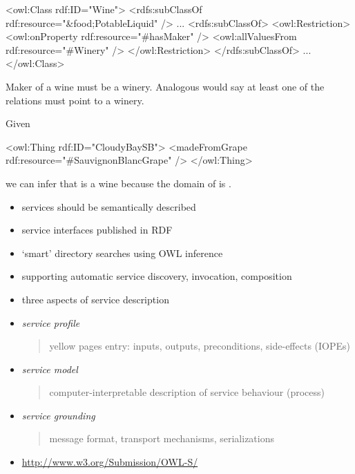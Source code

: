 \documentclass{sepslide-soa-faked} %
\begin{document}
\begin{slide}
\begin{xml}
<owl:Class rdf:ID="Wine">
  <rdfs:subClassOf rdf:resource="&food;PotableLiquid" />
  ...
  <rdfs:subClassOf>
    <owl:Restriction>
      <owl:onProperty rdf:resource="#hasMaker" />
      <owl:allValuesFrom rdf:resource="#Winery" />
    </owl:Restriction>
  </rdfs:subClassOf>
  ...
</owl:Class>
\end{xml}
Maker of a wine must be a winery.  Analogous
 would say at least one of the
 relations must point to a winery.
\end{slide}

\begin{slide}
Given
\begin{xml}
<owl:Thing rdf:ID="CloudyBaySB">
  <madeFromGrape rdf:resource="#SauvignonBlancGrape" />
</owl:Thing>
\end{xml}
we can infer that  is a wine because the
domain of  is .
\end{slide}

\begin{slide}
\begin{itemize}
\item services should be semantically described
\item service interfaces published in RDF
\item `smart' directory searches using OWL inference
\item supporting automatic service discovery, invocation, composition
\end{itemize}
\end{slide}

\begin{slide}
\begin{itemize}
\item three aspects of service description
\item \emph{service profile}
\begin{quote}
yellow pages entry: inputs, outputs, preconditions, side-effects (IOPEs)
\end{quote}
\item \emph{service model}
\begin{quote}
computer-interpretable description of service behaviour (process)
\end{quote}
\item \emph{service grounding}
\begin{quote}
message format, transport mechanisms, serializations
\end{quote}
\item \url{http://www.w3.org/Submission/OWL-S/}
\end{itemize}
\end{slide}
\end{document}
